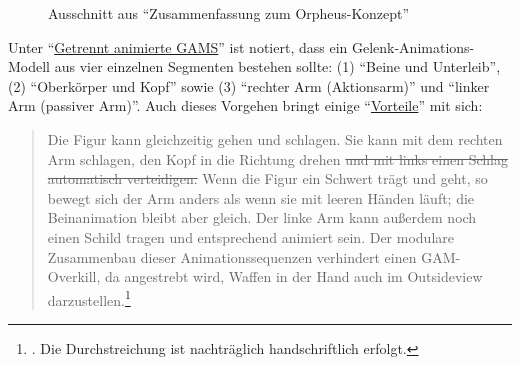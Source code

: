 \documentclass[a5paper,pagesize]{scrbook}
\begin{document}
\begin{figure}[p]
   \centering
   \caption{Ausschnitt aus \enquote{Zusammenfassung zum Orpheus-Konzept}}
   \label{fig:orpheus_spielfigurenanimation}
\end{figure}

Unter \enquote{\uline{Ge\-trennt ani\-mier\-te GAMS}} ist notiert, dass ein Gelenk-Animations-Modell aus vier einzelnen Segmenten bestehen sollte: (1) \enquote{Beine und Unterleib}, (2) \enquote{Oberkörper und Kopf} sowie (3) \enquote{rechter Arm (Aktionsarm)} und \enquote{linker Arm (passiver Arm)}.\autocite[S.~2]{orpheus_zusammenfassung}
Auch dieses Vorgehen bringt einige \enquote{\uline{Vorteile}} mit sich:

\begin{quote}
   Die Figur kann gleichzeitig gehen und schlagen.
   Sie kann mit dem rechten Arm schlagen, den Kopf in die Richtung drehen \sout{und mit links einen Schlag automatisch verteidigen.}
   Wenn die Figur ein Schwert trägt und geht, so bewegt sich der Arm anders als wenn sie mit leeren Händen läuft; die Beinanimation bleibt aber gleich.
   Der linke Arm kann außerdem noch einen Schild tragen und entsprechend animiert sein.
   Der modulare Zusammenbau dieser Animationssequenzen verhindert einen GAM-Overkill, da angestrebt wird, Waffen in der Hand auch im Outsideview darzustellen.\footnote{\autocite[S.~2]{orpheus_zusammenfassung}. Die Durchstreichung ist nachträglich handschriftlich erfolgt.}
\end{quote}
\end{document}
